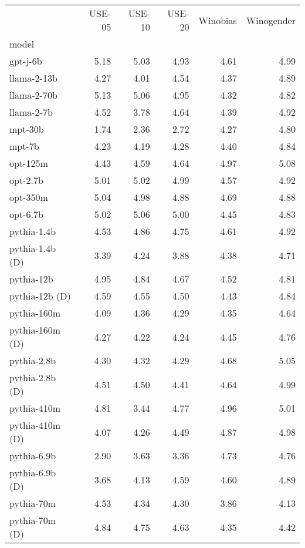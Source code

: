 \begin{tabular}{lrrrrr}
 & USE-05 & USE-10 & USE-20 & Winobias & Winogender \\
model &  &  &  &  &  \\
gpt-j-6b & 5.18 & 5.03 & 4.93 & 4.61 & 4.99 \\
llama-2-13b & 4.27 & 4.01 & 4.54 & 4.37 & 4.89 \\
llama-2-70b & 5.13 & 5.06 & 4.95 & 4.32 & 4.82 \\
llama-2-7b & 4.52 & 3.78 & 4.64 & 4.39 & 4.92 \\
mpt-30b & 1.74 & 2.36 & 2.72 & 4.27 & 4.80 \\
mpt-7b & 4.23 & 4.19 & 4.28 & 4.40 & 4.84 \\
opt-125m & 4.43 & 4.59 & 4.64 & 4.97 & 5.08 \\
opt-2.7b & 5.01 & 5.02 & 4.99 & 4.57 & 4.92 \\
opt-350m & 5.04 & 4.98 & 4.88 & 4.69 & 4.88 \\
opt-6.7b & 5.02 & 5.06 & 5.00 & 4.45 & 4.83 \\
pythia-1.4b & 4.53 & 4.86 & 4.75 & 4.61 & 4.92 \\
pythia-1.4b (D) & 3.39 & 4.24 & 3.88 & 4.38 & 4.71 \\
pythia-12b & 4.95 & 4.84 & 4.67 & 4.52 & 4.81 \\
pythia-12b (D) & 4.59 & 4.55 & 4.50 & 4.43 & 4.84 \\
pythia-160m & 4.09 & 4.36 & 4.29 & 4.35 & 4.64 \\
pythia-160m (D) & 4.27 & 4.22 & 4.24 & 4.45 & 4.76 \\
pythia-2.8b & 4.30 & 4.32 & 4.29 & 4.68 & 5.05 \\
pythia-2.8b (D) & 4.51 & 4.50 & 4.41 & 4.64 & 4.99 \\
pythia-410m & 4.81 & 3.44 & 4.77 & 4.96 & 5.01 \\
pythia-410m (D) & 4.07 & 4.26 & 4.49 & 4.87 & 4.98 \\
pythia-6.9b & 2.90 & 3.63 & 3.36 & 4.73 & 4.76 \\
pythia-6.9b (D) & 3.68 & 4.13 & 4.59 & 4.60 & 4.89 \\
pythia-70m & 4.53 & 4.34 & 4.30 & 3.86 & 4.13 \\
pythia-70m (D) & 4.84 & 4.75 & 4.63 & 4.35 & 4.42 \\
\end{tabular}
